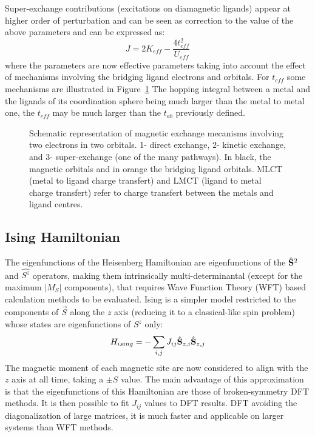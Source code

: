 \documentclass[12pt,a4paper]{report}
\numberwithin{equation}{section}
\begin{document}
Super-exchange contributions (excitations on diamagnetic ligands) appear at higher order of perturbation and can be seen as correction to the value of the above parameters and can be expressed as:
\begin{equation}
	J=2K_{eff}-\frac{4t_{eff}^2}{U_{eff}}
    \label{eq:JeffHubb}
\end{equation}
where the parameters are now effective parameters taking into account the effect of mechanisms involving the bridging ligand electrons and orbitals.
For $t_{eff}$ some mechanisms are illustrated in Figure~\ref{fig:MecanismeEchange}
The hopping integral between a metal and the ligands of its coordination sphere being much larger than the metal to metal one, the $t_{eff}$ may be much larger than the $t_{ab}$ previously defined.
\begin{figure}[!ht]
    \centering
    \caption[Schematic representation of magnetic exchange mecanisms involving two electrons in two orbitals.]{Schematic representation of magnetic exchange mecanisms involving two electrons in two orbitals. 1- direct exchange, 2- kinetic exchange, and 3- super-exchange (one of the many pathways). In black, the magnetic orbitals and in orange the bridging ligand orbitals. MLCT (metal to ligand charge transfert) and LMCT (ligand to metal charge transfert) refer to charge transfert between the metals and ligand centres. }
\label{fig:MecanismeEchange}
\end{figure}
\subsection*{Ising Hamiltonian}

The eigenfunctions of the Heisenberg Hamiltonian are eigenfunctions of the $\hat{\vb S}^2$ and $\hat{S^z}$ operators, making them intrinsically multi-determinantal (except for the maximum $|M_S|$ components), that requires Wave Function Theory (WFT) based calculation methods to be evaluated. Ising is a simpler model restricted to the components of $\vec{S}$ along the $z$ axis (reducing it to a classical-like spin problem) whose states are eigenfunctions of $S^z$ only:
\begin{equation}
    H_{ising}=- \sum_{i,j} J_{ij} \hat{\vb S}_{z,i} \hat{\vb S}_{z,j}
\end{equation}
The magnetic moment of each magnetic site are now considered to align with the $z$ axis at all time, taking a $\pm S$ value.
The main advantage of this approximation is that the eigenfunctions of this Hamiltonian are those of broken-symmetry DFT methods.
It is then possible to fit $J_{ij}$ values to DFT results. DFT avoiding the diagonalization of large matrices, it is much faster and applicable on larger systems than WFT methods.
\end{document}
